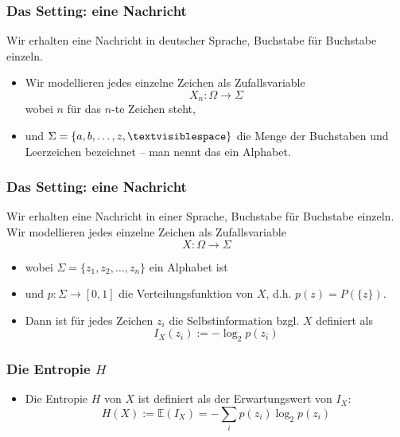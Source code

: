 \begin{frame}
  \frametitle{Das Setting: eine Nachricht}
  Wir erhalten eine Nachricht in deutscher Sprache, Buchstabe für Buchstabe einzeln.
  \begin{itemize}[<+->]
    \item Wir modellieren jedes einzelne Zeichen als Zufallsvariable
          \[X_n \colon \Omega \to \Sigma\]
          wobei $n$ für das $n$-te Zeichen steht,
    \item und $\Sigma = \{a, b, \dots, z, \textvisiblespace\}$ die Menge der Buchstaben und Leerzeichen bezeichnet -- man nennt das ein \alert{Alphabet}.
  \end{itemize}
\end{frame}

\begin{frame}
  \frametitle{Das Setting: eine Nachricht}
  Wir erhalten eine Nachricht in einer Sprache, Buchstabe für Buchstabe einzeln.
  Wir modellieren jedes einzelne Zeichen als Zufallsvariable
  \[X \colon \Omega \to \Sigma\]
  \vspace{-0.5cm}
  \begin{itemize}[<+->]
    \item wobei $\Sigma = \{z_1, z_2, \dots, z_n\}$ ein Alphabet ist
    \item und $p \colon \Sigma \to [0,1]$ die Verteilungsfunktion von $X$, d.h. $p(z) = P(\{z\})$.
    \item Dann ist für jedes Zeichen $z_i$ die \alert{Selbstinformation} bzgl. $X$ definiert als
          \[I_X(z_i) := -\log_2 p(z_i)\]
  \end{itemize}
\end{frame}

\begin{frame}
  \frametitle{Die Entropie $H$}
  \begin{itemize}[<+->]
      \item Die \alert{Entropie $H$} von $X$ ist definiert als der Erwartungswert von $I_X$:
  \[H(X) := \mathbb{E}(I_X) = -\sum_{i} p(z_i) \log_2 p(z_i)\]
 \end{itemize}
\end{frame}


